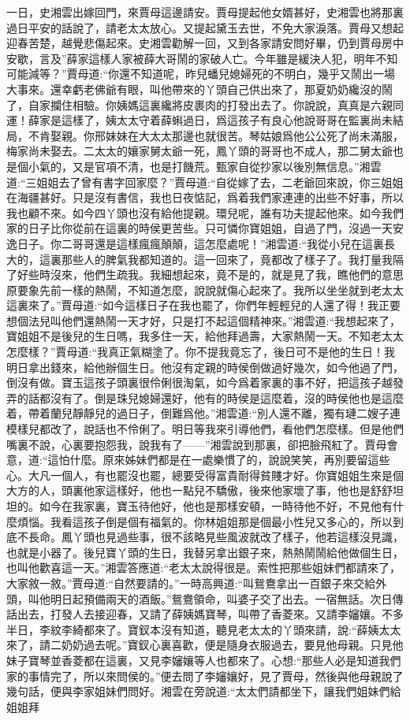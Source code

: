 \begin{parag}
    一日，史湘雲出嫁回門，來賈母這邊請安。賈母提起他女婿甚好，史湘雲也將那裏過日平安的話說了，請老太太放心。又提起黛玉去世，不免大家淚落。賈母又想起迎春苦楚，越覺悲傷起來。史湘雲勸解一回，又到各家請安問好畢，仍到賈母房中安歇，言及”薛家這樣人家被薛大哥鬧的家破人亡。今年雖是緩決人犯，明年不知可能減等？”賈母道:“你還不知道呢，昨兒蟠兒媳婦死的不明白，幾乎又鬧出一場大事來。還幸虧老佛爺有眼，叫他帶來的丫頭自己供出來了，那夏奶奶纔沒的鬧了，自家攔住相驗。你姨媽這裏纔將皮裹肉的打發出去了。你說說，真真是六親同運！薛家是這樣了，姨太太守着薛蝌過日，爲這孩子有良心他說哥哥在監裏尚未結局，不肯娶親。你邢妹妹在大太太那邊也就很苦。琴姑娘爲他公公死了尚未滿服，梅家尚未娶去。二太太的孃家舅太爺一死，鳳丫頭的哥哥也不成人，那二舅太爺也是個小氣的，又是官項不清，也是打饑荒。甄家自從抄家以後別無信息。”湘雲道:“三姐姐去了曾有書字回家麼？”賈母道:“自從嫁了去，二老爺回來說，你三姐姐在海疆甚好。只是沒有書信，我也日夜惦記，爲着我們家連連的出些不好事，所以我也顧不來。如今四丫頭也沒有給他提親。環兒呢，誰有功夫提起他來。如今我們家的日子比你從前在這裏的時侯更苦些。只可憐你寶姐姐，自過了門，沒過一天安逸日子。你二哥哥還是這樣瘋瘋顛顛，這怎麼處呢！”湘雲道:“我從小兒在這裏長大的，這裏那些人的脾氣我都知道的。這一回來了，竟都改了樣子了。我打量我隔了好些時沒來，他們生疏我。我細想起來，竟不是的，就是見了我，瞧他們的意思原要象先前一樣的熱鬧，不知道怎麼，說說就傷心起來了。我所以坐坐就到老太太這裏來了。”賈母道:“如今這樣日子在我也罷了，你們年輕輕兒的人還了得！我正要想個法兒叫他們還熱鬧一天才好，只是打不起這個精神來。”湘雲道:“我想起來了，寶姐姐不是後兒的生日嗎，我多住一天，給他拜過壽，大家熱鬧一天。不知老太太怎麼樣？”賈母道:“我真正氣糊塗了。你不提我竟忘了，後日可不是他的生日！我明日拿出錢來，給他辦個生日。他沒有定親的時侯倒做過好幾次，如今他過了門，倒沒有做。寶玉這孩子頭裏很伶俐很淘氣，如今爲着家裏的事不好，把這孩子越發弄的話都沒有了。倒是珠兒媳婦還好，他有的時侯是這麼着，沒的時侯他也是這麼着，帶着蘭兒靜靜兒的過日子，倒難爲他。”湘雲道:“別人還不離，獨有璉二嫂子連模樣兒都改了，說話也不伶俐了。明日等我來引導他們，看他們怎麼樣。但是他們嘴裏不說，心裏要抱怨我，說我有了——”湘雲說到那裏，卻把臉飛紅了。賈母會意，道:“這怕什麼。原來姊妹們都是在一處樂慣了的，說說笑笑，再別要留這些心。大凡一個人，有也罷沒也罷，總要受得富貴耐得貧賤才好。你寶姐姐生來是個大方的人，頭裏他家這樣好，他也一點兒不驕傲，後來他家壞了事，他也是舒舒坦坦的。如今在我家裏，寶玉待他好，他也是那樣安頓，一時待他不好，不見他有什麼煩惱。我看這孩子倒是個有福氣的。你林姐姐那是個最小性兒又多心的，所以到底不長命。鳳丫頭也見過些事，很不該略見些風波就改了樣子，他若這樣沒見識，也就是小器了。後兒寶丫頭的生日，我替另拿出銀子來，熱熱鬧鬧給他做個生日，也叫他歡喜這一天。”湘雲答應道:“老太太說得很是。索性把那些姐妹們都請來了，大家敘一敘。”賈母道:“自然要請的。”一時高興道:“叫鴛鴦拿出一百銀子來交給外頭，叫他明日起預備兩天的酒飯。”鴛鴦領命，叫婆子交了出去。一宿無話。次日傳話出去，打發人去接迎春，又請了薛姨媽寶琴，叫帶了香菱來。又請李嬸孃。不多半日，李紋李綺都來了。寶釵本沒有知道，聽見老太太的丫頭來請，說:“薛姨太太來了，請二奶奶過去呢。”寶釵心裏喜歡，便是隨身衣服過去，要見他母親。只見他妹子寶琴並香菱都在這裏，又見李嬸孃等人也都來了。心想:“那些人必是知道我們家的事情完了，所以來問侯的。”便去問了李嬸孃好，見了賈母，然後與他母親說了幾句話，便與李家姐妹們問好。湘雲在旁說道:“太太們請都坐下，讓我們姐妹們給姐姐拜
\end{parag}
